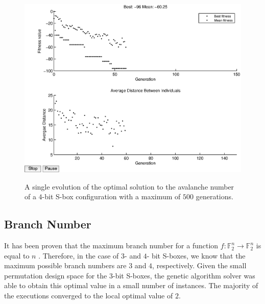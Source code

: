 \documentclass[11pt]{article}
\newcommand{\field}[1]{\mathbb{#1}} %
\begin{document}
\begin{figure}
\centering
	\includegraphics[scale=0.5]{images/avalanche_results16.eps} \\
	\label{av16}
	\caption{A single evolution of the optimal solution to the avalanche number of a $4$-bit S-box configuration with a maximum of $500$ generations.}
\end{figure}

\subsection{Branch Number}


It has been proven that the maximum branch number for a function $f : \field{F}_2^n \to \field{F}_2^n$ is equal to $n$ \cite{MaxBN}. Therefore, in the case of $3$- and $4$- bit S-boxes, we know that the maximum possible branch numbers are $3$ and $4$, respectively. Given the small permutation design space for the $3$-bit S-boxes, the genetic algorithm solver was able to obtain this optimal value in a small number of instances. The majority of the executions converged to the local optimal value of $2$.
\end{document}
